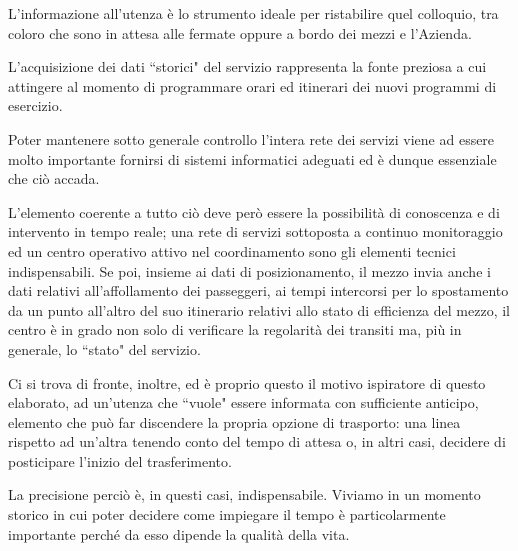 L'informazione all'utenza è lo strumento ideale per ristabilire quel colloquio, tra coloro che sono in attesa alle fermate oppure a bordo dei mezzi e l'Azienda.

L'acquisizione dei dati ``storici" del servizio rappresenta la fonte preziosa a cui attingere al momento di programmare orari ed itinerari dei nuovi programmi di esercizio.

Poter mantenere sotto generale controllo l'intera rete dei servizi viene ad essere molto importante fornirsi di sistemi informatici adeguati ed è dunque essenziale che ciò accada.

L'elemento coerente a tutto ciò deve però essere la possibilità di conoscenza e di intervento in tempo reale; una rete di servizi sottoposta a continuo monitoraggio ed un centro operativo attivo nel coordinamento sono gli elementi tecnici indispensabili.
Se poi, insieme ai dati di posizionamento, il mezzo invia anche i dati relativi all’affollamento dei passeggeri, ai tempi intercorsi per lo spostamento da un punto all'altro del suo itinerario relativi allo stato di efficienza del mezzo, il centro è in grado non solo di verificare la regolarità dei transiti ma, più in generale, lo ``stato" del servizio.

Ci si trova di fronte, inoltre, ed è proprio questo il motivo ispiratore di questo elaborato, ad un'utenza che ``vuole" essere informata con sufficiente anticipo, elemento che può far discendere la propria opzione di trasporto: una linea rispetto ad un'altra tenendo conto del tempo di attesa o, in altri casi, decidere di posticipare l'inizio del trasferimento.

La precisione perciò è, in questi casi, indispensabile. Viviamo in un momento storico in cui poter decidere come impiegare il tempo è particolarmente importante perché da esso dipende la qualità della vita.

